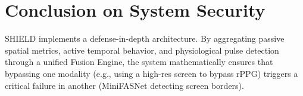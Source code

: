 \section{Conclusion on System Security}
SHIELD implements a defense-in-depth architecture. By aggregating passive spatial metrics, active temporal behavior, and physiological pulse detection through a unified Fusion Engine, the system mathematically ensures that bypassing one modality (e.g., using a high-res screen to bypass rPPG) triggers a critical failure in another (MiniFASNet detecting screen borders).